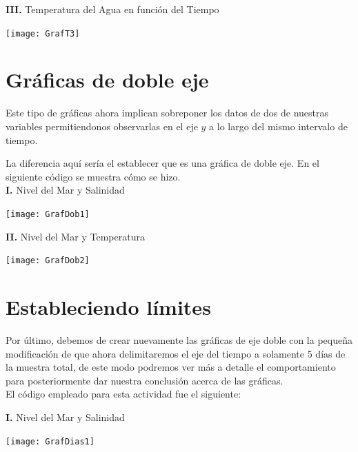\textbf{III.} Temperatura del Agua en función del Tiempo
\begin{center}
\texttt{[image: GrafT3]}
\end{center}


\section{Gráficas de doble eje}
Este tipo de gráficas ahora implican sobreponer los datos de dos de nuestras variables permitiendonos observarlas en el eje $y$ a lo largo del mismo intervalo de tiempo.

La diferencia aquí sería el establecer que es una gráfica de doble eje. En el siguiente código se muestra cómo se hizo.\\

\noindent \textbf{I.} Nivel del Mar y Salinidad
\begin{center}
\texttt{[image: GrafDob1]}
\end{center}

\textbf{II.} Nivel del Mar y Temperatura
\begin{center}
\texttt{[image: GrafDob2]}
\end{center}


\section{Estableciendo límites}
Por último, debemos de crear nuevamente las gráficas de eje doble con la pequeña modificación de que ahora delimitaremos el eje del tiempo a solamente 5 días de la muestra total, de este modo podremos ver más a detalle el comportamiento para posteriormente dar nuestra conclusión acerca de las gráficas.
\\ El código empleado para esta actividad fue el siguiente:

\noindent \textbf{I.} Nivel del Mar y Salinidad
\begin{center}
\texttt{[image: GrafDias1]}
\end{center}

